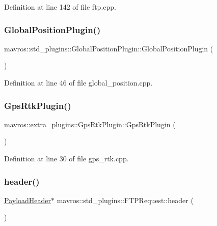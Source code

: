 Definition at line 142 of file ftp.\+cpp.

\mbox{\label{group__plugin_ga0f7a01f0082226ac8f883f5ce9b53b3d}} 
\subsubsection{\texorpdfstring{GlobalPositionPlugin()}{GlobalPositionPlugin()}}
{\footnotesize\ttfamily mavros\+::std\+\_\+plugins\+::\+Global\+Position\+Plugin\+::\+Global\+Position\+Plugin (\begin{DoxyParamCaption}{ }\end{DoxyParamCaption})\hspace{0.3cm}{\ttfamily [inline]}}



Definition at line 46 of file global\+\_\+position.\+cpp.

\mbox{\label{group__plugin_ga6a5cb4aec8a08bcfb3994274de9a085c}} 
\subsubsection{\texorpdfstring{GpsRtkPlugin()}{GpsRtkPlugin()}}
{\footnotesize\ttfamily mavros\+::extra\+\_\+plugins\+::\+Gps\+Rtk\+Plugin\+::\+Gps\+Rtk\+Plugin (\begin{DoxyParamCaption}{ }\end{DoxyParamCaption})\hspace{0.3cm}{\ttfamily [inline]}}



Definition at line 30 of file gps\+\_\+rtk.\+cpp.

\mbox{\label{group__plugin_gacb2fd6b1a67b8f6d182b943f64af8802}} 
\subsubsection{\texorpdfstring{header()}{header()}}
{\footnotesize\ttfamily \mbox{\hyperlink{structmavros_1_1std__plugins_1_1FTPRequest_1_1PayloadHeader}{Payload\+Header}}$\ast$ mavros\+::std\+\_\+plugins\+::\+F\+T\+P\+Request\+::header (\begin{DoxyParamCaption}{ }\end{DoxyParamCaption})\hspace{0.3cm}{\ttfamily [inline]}}



